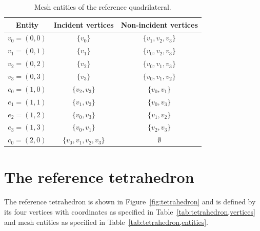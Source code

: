 \begin{table}[H]
\linespread{1.2}\selectfont
  \begin{center}
    \begin{tabular}{|c|c|c|}
      \hline
      Entity & Incident vertices & Non-incident vertices \\
      \hline
      \hline
      $v_0 = (0, 0)$ & $\{v_0\}$ & $\{v_1, v_2, v_3\}$ \\
      \hline
      $v_1 = (0, 1)$ & $\{v_1\}$ & $\{v_0, v_2, v_3\}$ \\
      \hline
      $v_2 = (0, 2)$ & $\{v_2\}$ & $\{v_0, v_1, v_3\}$ \\
      \hline
      $v_3 = (0, 3)$ & $\{v_3\}$ & $\{v_0, v_1, v_2\}$ \\
      \hline
      $e_0 = (1, 0)$ & $\{v_2, v_3\}$ & $\{v_0, v_1\}$ \\
      \hline
      $e_1 = (1, 1)$ & $\{v_1, v_2\}$ & $\{v_0, v_3\}$ \\
      \hline
      $e_2 = (1, 2)$ & $\{v_0, v_3\}$ & $\{v_1, v_2\}$ \\
      \hline
      $e_3 = (1, 3)$ & $\{v_0, v_1\}$ & $\{v_2, v_3\}$ \\
      \hline
      $c_0 = (2, 0)$ & $\{v_0, v_1, v_2, v_3\}$ & $\emptyset$ \\
      \hline
    \end{tabular}
    \caption{Mesh entities of the reference quadrilateral.}
    \label{tab:quadrilateral,entities}
  \end{center}
\end{table}

\newpage
\section{The reference tetrahedron}

The reference tetrahedron is shown in Figure~\ref{fig:tetrahedron} and
is defined by its four vertices with coordinates as specified in
Table~\ref{tab:tetrahedron,vertices} and mesh entities as specified in
Table~\ref{tab:tetrahedron,entities}.

